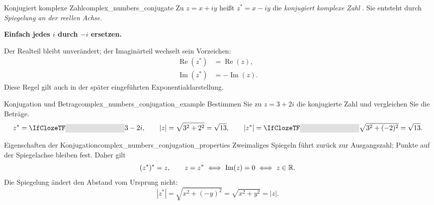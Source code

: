 \par\noindent\begin{minipage}{\linewidth}
\begin{DefinitionBox}{Konjugiert komplexe Zahl}{complex_numbers_conjugate}
  Zu $z=x+iy$ heißt $z^*=x-iy$ die \emph{konjugiert komplexe Zahl}
  . Sie entsteht durch
  \emph{Spiegelung an der reellen Achse}.
  \par\medskip
  \begin{minipage}[c]{0.51\linewidth}
  \end{minipage}\hfill
  \begin{minipage}[c]{0.44\linewidth}
    \textbf{Einfach jedes $i$ durch $-i$ ersetzen.}

    Der Realteil bleibt unverändert; der Imaginärteil wechselt sein Vorzeichen:
    \[
      \begin{aligned}
        \operatorname{Re}(z^*)&=\operatorname{Re}(z),\\[4pt]
        \operatorname{Im}(z^*)&=-\operatorname{Im}(z).
      \end{aligned}
    \]
    Diese Regel gilt auch in der später eingeführten Exponentialdarstellung.
  \end{minipage}
\end{DefinitionBox}
\vspace{-0.5\baselineskip}
\begin{ExampleBox}{Konjugation und Betrag}{complex_numbers_conjugation_example}
  Bestimmen Sie zu $z=3+2i$ die konjugierte Zahl und vergleichen Sie die Beträge.
  \[
    z^*=\Cloze{3cm}{3-2i},\qquad
    |z|=\sqrt{3^2+2^2}=\sqrt{13},\qquad
    |z^*|=\Cloze{3cm}{\sqrt{3^2+(-2)^2}=\sqrt{13}}.
  \]
\end{ExampleBox}
\end{minipage}\par

\begin{KeyPointBox}{Eigenschaften der Konjugation}{complex_numbers_conjugation_properties}
  Zweimaliges Spiegeln führt zurück zur Ausgangszahl; Punkte auf der
  Spiegelachse bleiben fest. Daher gilt
  \[
    (z^*)^*=z,\qquad
    z=z^*\ \Longleftrightarrow\ \operatorname{Im}(z)=0
          \ \Longleftrightarrow\ z\in\mathbb{R}.
  \]
  Die Spiegelung ändert den Abstand vom Ursprung nicht:
  \[
    |z^*|=\sqrt{x^2+(-y)^2}=\sqrt{x^2+y^2}=|z|.
  \]
\end{KeyPointBox}
